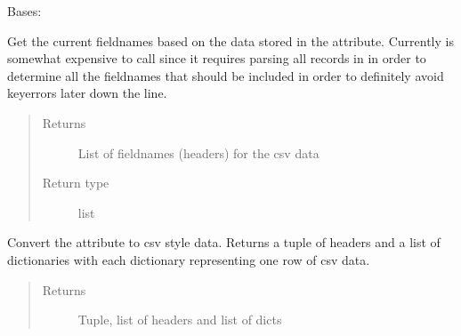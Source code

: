 \documentclass[letterpaper,10pt,english]{sphinxmanual}
\begin{document}
\begin{fulllineitems}
\label{\detokenize{polo.utils:polo.utils.io_utils.RunCsvWriter}}
Bases: {\hyperref[\detokenize{polo.utils:polo.utils.io_utils.RunSerializer}]{}}

\begin{fulllineitems}
\label{\detokenize{polo.utils:polo.utils.io_utils.RunCsvWriter.fieldnames}}
Get the current fieldnames based on the data stored in the
 attribute.
Currently is somewhat expensive to call since it
requires parsing all records in 
in order to determine all the
fieldnames that should be included in order to definitely avoid
keyerrors later down the line.
\begin{quote}\begin{description}
\item[{Returns}] \leavevmode
List of fieldnames (headers) for the csv data

\item[{Return type}] \leavevmode
list

\end{description}\end{quote}

\end{fulllineitems}


\begin{fulllineitems}
\label{\detokenize{polo.utils:polo.utils.io_utils.RunCsvWriter.get_csv_data}}
Convert the  
attribute to csv style data. Returns a tuple of
headers and a list of dictionaries with each dictionary representing
one row of csv data.
\begin{quote}\begin{description}
\item[{Returns}] \leavevmode
Tuple, list of headers and list of dicts


\end{description}
\end{quote}
\end{fulllineitems}
\end{fulllineitems}
\end{document}
